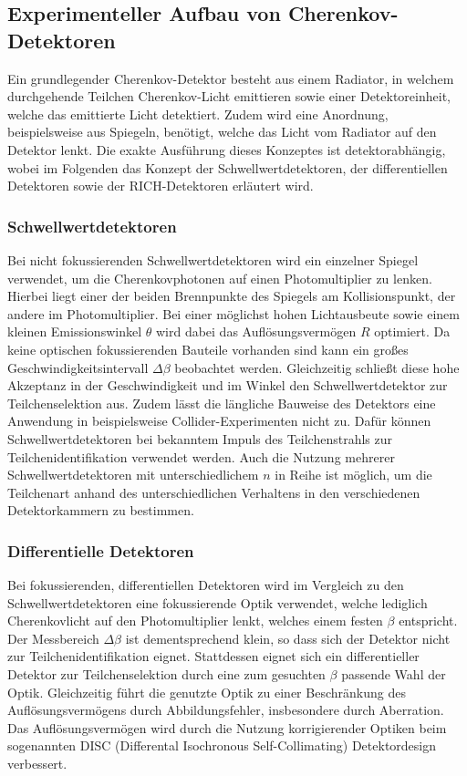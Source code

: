 \subsection{Experimenteller Aufbau von Cherenkov-Detektoren}
Ein grundlegender Cherenkov-Detektor besteht aus einem Radiator, in welchem durchgehende Teilchen Cherenkov-Licht emittieren sowie einer Detektoreinheit, welche das emittierte Licht detektiert. Zudem wird eine Anordnung, beispielsweise aus Spiegeln, benötigt, welche das Licht vom Radiator auf den Detektor lenkt.
Die exakte Ausführung dieses Konzeptes ist detektorabhängig, wobei im Folgenden das Konzept der Schwellwertdetektoren, der differentiellen Detektoren sowie der RICH-Detektoren erläutert wird.

\subsubsection{Schwellwertdetektoren}
Bei nicht fokussierenden Schwellwertdetektoren wird ein einzelner Spiegel verwendet, um die Cherenkovphotonen auf einen Photomultiplier zu lenken.
Hierbei liegt einer der beiden Brennpunkte des Spiegels am Kollisionspunkt, der andere im Photomultiplier.
Bei einer möglichst hohen Lichtausbeute sowie einem kleinen Emissionswinkel $\theta$ wird dabei das Auflösungsvermögen $R$ optimiert.
Da keine optischen fokussierenden Bauteile vorhanden sind kann ein großes Geschwindigkeitsintervall $\Delta\beta$ beobachtet werden. 
Gleichzeitig schließt diese hohe Akzeptanz in der Geschwindigkeit und im Winkel den Schwellwertdetektor zur Teilchenselektion aus.
Zudem lässt die längliche Bauweise des Detektors eine Anwendung in beispielsweise Collider-Experimenten nicht zu.
Dafür können Schwellwertdetektoren bei bekanntem Impuls des Teilchenstrahls zur Teilchenidentifikation verwendet werden.
Auch die Nutzung mehrerer Schwellwertdetektoren mit unterschiedlichem $n$ in Reihe ist möglich, um die Teilchenart anhand des unterschiedlichen Verhaltens in den verschiedenen Detektorkammern zu bestimmen.

\subsubsection{Differentielle Detektoren}
Bei fokussierenden, differentiellen Detektoren wird im Vergleich zu den Schwellwertdetektoren eine fokussierende Optik verwendet, welche lediglich Cherenkovlicht auf den Photomultiplier lenkt, welches einem festen $\beta$ entspricht.
Der Messbereich $\Delta \beta$ ist dementsprechend klein, so dass sich der Detektor nicht zur Teilchenidentifikation eignet.
Stattdessen eignet sich ein differentieller Detektor zur Teilchenselektion durch eine zum gesuchten $\beta$ passende Wahl der Optik.
Gleichzeitig führt die genutzte Optik zu einer Beschränkung des Auflösungsvermögens durch Abbildungsfehler, insbesondere durch Aberration.
Das Auflösungsvermögen wird durch die Nutzung korrigierender Optiken beim sogenannten DISC (Differental Isochronous Self-Collimating) Detektordesign verbessert.

